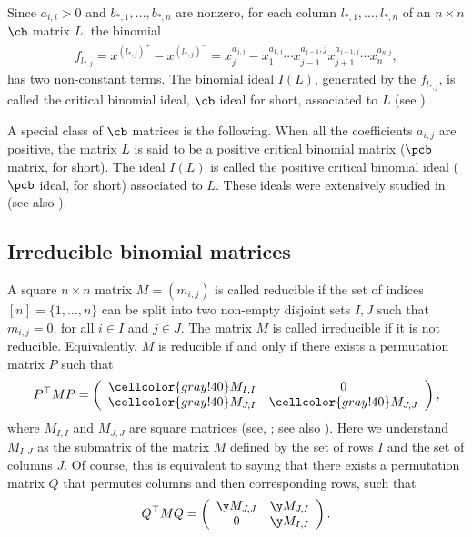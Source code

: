 Since $a_{i,i}>0$ and $b_{*,1},\ldots ,b_{*,n}$ are nonzero, for each
column $l_{*,1},\ldots ,l_{*,n}$ of an $n\times n$ $\cb$ matrix $L$,
the binomial
\begin{eqnarray*}
f_{l_{*,j}}=x^{(l_{*,j})^+}-x^{(l_{*,j})^-}=x_j^{a_{j,j}}-x_1^{a_{1,j}}\cdots
x_{j-1}^{a_{j-1},j}x_{j+1}^{a_{j+1,j}}\cdots x_n^{a_{n,j}},
\end{eqnarray*}
has two non-constant terms. The binomial ideal $I(L)$, generated by
the $f_{l_{*,j}}$, is called the critical binomial ideal, $\cb$ ideal
for short, associated to $L$ (see \cite{opv}).

A special class of $\cb$ matrices is the following. When all the
coefficients $a_{i,j}$ are positive, the matrix $L$ is said to be a
positive critical binomial matrix ($\pcb$ matrix, for short). The
ideal $I(L)$ is called the positive critical binomial ideal ($\pcb$
ideal, for short) associated to $L$. These ideals were extensively
studied in \cite{op} (see also \cite{opv}).

\subsection{Irreducible binomial matrices}\label{ibm}

 A square $n\times n$ matrix $M=(m_{i,j})$ is called
reducible if the set of indices $[n]=\{1,\ldots ,n\}$ can be split
into two non-empty disjoint sets $I,J$ such that $m_{i,j}=0$, for all
$i\in I$ and $j\in J$. The matrix $M$ is called irreducible if it is
not reducible. Equivalently, $M$ is reducible if and only if there
exists a permutation matrix $P$ such that
\begin{eqnarray}\label{reducedform}
P^{\top}MP=\left(\begin{array}{cc}\cellcolor{gray!40} M_{I,I}&0\\
\cellcolor{gray!40} M_{J,I}&\cellcolor{gray!40} M_{J,J}\end{array}\right),
\end{eqnarray}
where $M_{I,I}$ and $M_{J,J}$ are square matrices (see, \eg
\cite[Chapter~XIII, p.50]{gantmacher}; see also \cite[\S~3.2]{br}).
Here we understand $M_{I,J}$ as the submatrix of the matrix $M$
defined by the set of rows $I$ and the set of columns $J$.  Of course,
this is equivalent to saying that there exists a permutation matrix
$Q$ that permutes columns and then corresponding rows, such that
\begin{eqnarray*}
Q^{\top}MQ=\left(\begin{array}{cc}
\y M_{J,J}&\y M_{J,I}\\0&\y M_{I,I}\end{array}\right).
\end{eqnarray*}

